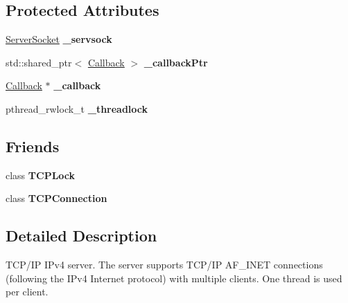 \subsection*{Protected Attributes}
\begin{DoxyCompactItemize}
\item 
\hypertarget{classcppu_1_1_t_c_p_server_a8e4422abf23dc5bd195d05a3e9eee167}{\hyperlink{classcppu_1_1_server_socket}{Server\+Socket} {\bfseries \+\_\+servsock}}\label{classcppu_1_1_t_c_p_server_a8e4422abf23dc5bd195d05a3e9eee167}

\item 
\hypertarget{classcppu_1_1_t_c_p_server_abe36d427d7b047cdd342e282611c841e}{std\+::shared\+\_\+ptr$<$ \hyperlink{structcppu_1_1_t_c_p_server_1_1_callback}{Callback} $>$ {\bfseries \+\_\+callback\+Ptr}}\label{classcppu_1_1_t_c_p_server_abe36d427d7b047cdd342e282611c841e}

\item 
\hypertarget{classcppu_1_1_t_c_p_server_a68940bd70ac6941ca49d1e51b631f5e9}{\hyperlink{structcppu_1_1_t_c_p_server_1_1_callback}{Callback} $\ast$ {\bfseries \+\_\+callback}}\label{classcppu_1_1_t_c_p_server_a68940bd70ac6941ca49d1e51b631f5e9}

\item 
\hypertarget{classcppu_1_1_t_c_p_server_aea2dbb4b5762044217096e52cd559b97}{pthread\+\_\+rwlock\+\_\+t {\bfseries \+\_\+threadlock}}\label{classcppu_1_1_t_c_p_server_aea2dbb4b5762044217096e52cd559b97}

\end{DoxyCompactItemize}
\subsection*{Friends}
\begin{DoxyCompactItemize}
\item 
\hypertarget{classcppu_1_1_t_c_p_server_a94abdeb80587f39a869fde6f24522a78}{class {\bfseries T\+C\+P\+Lock}}\label{classcppu_1_1_t_c_p_server_a94abdeb80587f39a869fde6f24522a78}

\item 
\hypertarget{classcppu_1_1_t_c_p_server_a9d1c27bdfcdd48c5f07a5d0dce43b346}{class {\bfseries T\+C\+P\+Connection}}\label{classcppu_1_1_t_c_p_server_a9d1c27bdfcdd48c5f07a5d0dce43b346}

\end{DoxyCompactItemize}


\subsection{Detailed Description}
T\+C\+P/\+I\+P I\+Pv4 server. The server supports T\+C\+P/\+I\+P A\+F\+\_\+\+I\+N\+E\+T connections (following the I\+Pv4 Internet protocol) with multiple clients. One thread is used per client. 

